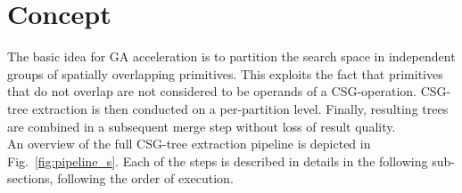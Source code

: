 \section{Concept}
\label{sec:concept}
The basic idea for \ac{GA} acceleration is to partition the search space in independent groups of spatially overlapping primitives.
This exploits the fact that primitives that do not overlap are not considered to be operands of a \ac{CSG}-operation.
\ac{CSG}-tree extraction is then conducted on a per-partition level. 
Finally, resulting trees are combined in a subsequent merge step without loss of result quality. 
\\
An overview of the full \ac{CSG}-tree extraction pipeline is depicted in Fig.~\ref{fig:pipeline_s}. 
Each of the steps is described in details in the following sub-sections, following the order of execution.
